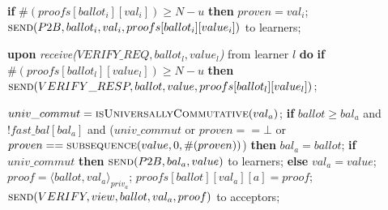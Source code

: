 \begin{algorithm}
\begin{algorithmic}[1]
		\State \hspace{\algorithmicindent}\hspace{\algorithmicindent} \textbf{if} $\#(proofs[ballot_i][val_i]) \geq N-u$ \textbf{then}
		\State \hspace{\algorithmicindent}\hspace{\algorithmicindent} \hspace{\algorithmicindent} $proven = val_i$;
		\State \hspace{\algorithmicindent} \hspace{\algorithmicindent}\hspace{\algorithmicindent} $\Call{send}{P2B, ballot_i, val_i, proofs[ballot_i][value_i]}$ to learners;

		\State		
		\State \textbf{upon} \textit{receive($VERIFY\_REQ, ballot_l, value_l$)} from learner $l$ \textbf{do}
		\State \hspace{\algorithmicindent} \textbf{if} $\#(proofs[ballot_l][value_l]) \geq N-u$ \textbf{then}
		\State \hspace{\algorithmicindent}\hspace{\algorithmicindent} $\Call{send}{VERIFY\_RESP, ballot, value, proofs[ballot_l][value_l]}$;

		\State
		\State $univ\_commut = \Call{isUniversallyCommutative}{val_a}$;
		\State \textbf{if} $ballot \geq bal_a$ and $!fast\_bal[bal_a]$ and ($univ\_commut$ or $proven == \bot$ or $proven == \Call{subsequence}{value, 0, \#(proven)}$) \textbf{then}
		\State \hspace{\algorithmicindent} $bal_a = ballot$;
		\State \hspace{\algorithmicindent} \textbf{if} $univ\_commut$ \textbf{then}
		\State \hspace{\algorithmicindent}\hspace{\algorithmicindent} $\Call{send}{P2B,bal_a, value}$ to learners;
		\State \hspace{\algorithmicindent} \textbf{else} 
		\State \hspace{\algorithmicindent}\hspace{\algorithmicindent} $val_a = value$;
		\State \hspace{\algorithmicindent}\hspace{\algorithmicindent} $proof = \langle ballot, val_a \rangle_{priv_a}$;
		\State \hspace{\algorithmicindent}\hspace{\algorithmicindent} $proofs[ballot][val_a][a] = proof$;
		\State \hspace{\algorithmicindent}\hspace{\algorithmicindent} $\Call{send}{VERIFY, view, ballot, val_a, proof}$ to acceptors;
		\EndFunction
		

\end{algorithmic}
\end{algorithm}
